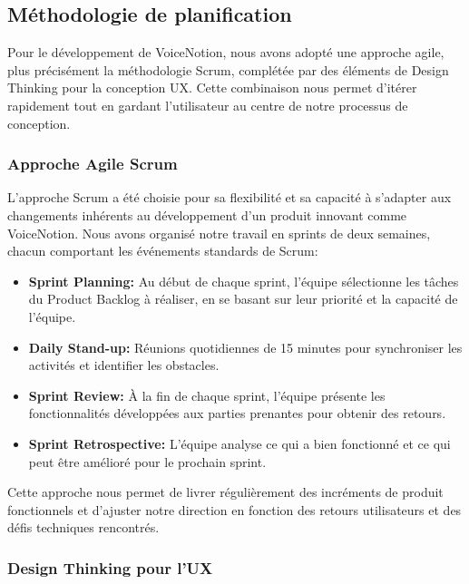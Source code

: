 \subsection{Méthodologie de planification}

Pour le développement de VoiceNotion, nous avons adopté une approche agile, plus précisément la méthodologie Scrum, complétée par des éléments de Design Thinking pour la conception UX. Cette combinaison nous permet d'itérer rapidement tout en gardant l'utilisateur au centre de notre processus de conception.

\subsubsection{Approche Agile Scrum}

L'approche Scrum a été choisie pour sa flexibilité et sa capacité à s'adapter aux changements inhérents au développement d'un produit innovant comme VoiceNotion. Nous avons organisé notre travail en sprints de deux semaines, chacun comportant les événements standards de Scrum:

\begin{itemize}
    \item \textbf{Sprint Planning:} Au début de chaque sprint, l'équipe sélectionne les tâches du Product Backlog à réaliser, en se basant sur leur priorité et la capacité de l'équipe.
    
    \item \textbf{Daily Stand-up:} Réunions quotidiennes de 15 minutes pour synchroniser les activités et identifier les obstacles.
    
    \item \textbf{Sprint Review:} À la fin de chaque sprint, l'équipe présente les fonctionnalités développées aux parties prenantes pour obtenir des retours.
    
    \item \textbf{Sprint Retrospective:} L'équipe analyse ce qui a bien fonctionné et ce qui peut être amélioré pour le prochain sprint.
\end{itemize}

Cette approche nous permet de livrer régulièrement des incréments de produit fonctionnels et d'ajuster notre direction en fonction des retours utilisateurs et des défis techniques rencontrés.

\subsubsection{Design Thinking pour l'UX}

